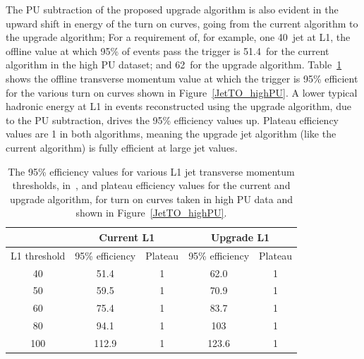 The \ac{PU} subtraction of the proposed upgrade algorithm is also evident in the upward shift in energy of the turn on curves, going from the current algorithm to the upgrade algorithm;
For a requirement of, for example, one 40~\GeV jet at \ac{L1}, the offline value at which 95\% of events pass the 
trigger is 51.4~\GeV for the current algorithm in the high \ac{PU} dataset; and 62~\GeV for the upgrade algorithm.
Table~\ref{tab:trigTO} shows the offline transverse momentum value at which the trigger is 95\% efficient for the various turn on curves shown in Figure~\ref{JetTO_highPU}.
A lower typical hadronic energy at \ac{L1} in events reconstructed using the upgrade algorithm, 
due to the \ac{PU} subtraction, drives the 95\% efficiency values up. 
Plateau efficiency values are 1 in both algorithms, meaning the upgrade jet algorithm (like the current algorithm) is fully efficient at large jet \pt values.

\begin{table}[htb]   
    \begin{center}
        \caption{The 95\% efficiency values for various \ac{L1} jet transverse momentum thresholds, in~\GeV, and plateau efficiency values for the current and upgrade algorithm, for turn on curves taken in high \ac{PU} data and shown in Figure~\ref{JetTO_highPU}.}\label{tab:trigTO}
        {%
            \begin{tabular}{c|cc|cc} 
 &   \multicolumn{2}{c|}{Current L1} &  \multicolumn{2}{c}{Upgrade L1} \\ \hline 
         L1 threshold  & 95\% efficiency & Plateau & 95\% efficiency & Plateau \\ \hline
         40  & 51.4 & 1 & 62.0 & 1 \\
         50  & 59.5 & 1 & 70.9 & 1 \\
         60  & 75.4 & 1 & 83.7 & 1 \\
         80  & 94.1 & 1 & 103  & 1 \\
        100  & 112.9 & 1 & 123.6 & 1 \\
            \end{tabular}
        } 
    \end{center}
\end{table}


